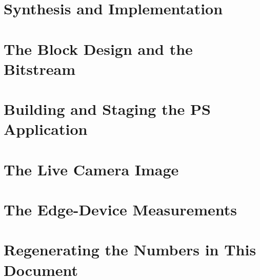 \section{Synthesis and Implementation}
\label{sec:repro-impl}

\section{The Block Design and the Bitstream}
\label{sec:repro-bd}

\section{Building and Staging the PS Application}
\label{sec:repro-ps}

\section{The Live Camera Image}
\label{sec:repro-camera}

\section{The Edge-Device Measurements}
\label{sec:repro-edge}

\section{Regenerating the Numbers in This Document}
\label{sec:repro-numbers}
